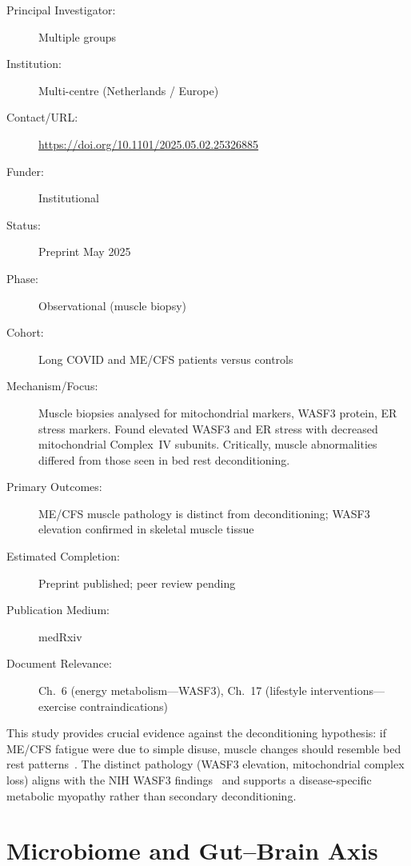 \begin{description}
    \item[Principal Investigator:] Multiple groups
    \item[Institution:] Multi-centre (Netherlands / Europe)
    \item[Contact/URL:] \url{https://doi.org/10.1101/2025.05.02.25326885}
    \item[Funder:] Institutional
    \item[Status:] Preprint May 2025
    \item[Phase:] Observational (muscle biopsy)
    \item[Cohort:] Long COVID and ME/CFS patients versus controls
    \item[Mechanism/Focus:] Muscle biopsies analysed for mitochondrial
        markers, WASF3 protein, ER stress markers.  Found elevated WASF3 and
        ER stress with decreased mitochondrial Complex~IV subunits.
        Critically, muscle abnormalities differed from those seen in bed rest
        deconditioning.
    \item[Primary Outcomes:] ME/CFS muscle pathology is distinct from
        deconditioning; WASF3 elevation confirmed in skeletal muscle tissue
    \item[Estimated Completion:] Preprint published; peer review pending
    \item[Publication Medium:] medRxiv
    \item[Document Relevance:] Ch.~6 (energy metabolism---WASF3), Ch.~17
        (lifestyle interventions---exercise contraindications)
\end{description}

This study provides crucial evidence against the deconditioning hypothesis:
if ME/CFS fatigue were due to simple disuse, muscle changes should resemble
bed rest patterns~\cite{SkeletalMuscle2025longCOVID}.  The distinct
pathology (WASF3 elevation, mitochondrial complex loss) aligns with the NIH
WASF3 findings~\cite{wang2023wasf3} and supports a disease-specific
metabolic myopathy rather than secondary deconditioning.

\section{Microbiome and Gut--Brain Axis}
\label{sec:registry-microbiome}

